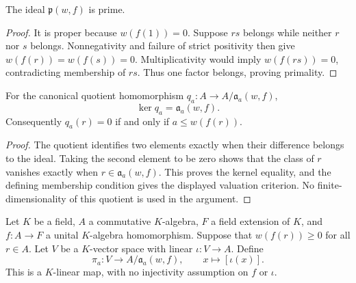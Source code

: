\begin{lemma}
\label{sc0-canonical-port:alg:positive-valuation-ideal-prime}
\leanok
The ideal \(\mathfrak p(w,f)\) is prime.
\end{lemma}
\begin{proof}
It is proper because \(w(f(1))=0\). Suppose \(rs\) belongs
while neither \(r\) nor \(s\) belongs. Nonnegativity and failure
of strict positivity then give \(w(f(r))=w(f(s))=0\).
Multiplicativity would imply \(w(f(rs))=0\), contradicting
membership of \(rs\). Thus one factor belongs, proving primality.
\end{proof}

\begin{lemma}
\label{sc0-canonical-port:alg:valuation-quotient-kernel}
\leanok
For the canonical quotient homomorphism
\(q_a:A\to A/\mathfrak a_a(w,f)\),
\[
 \ker q_a=\mathfrak a_a(w,f).
\]
Consequently \(q_a(r)=0\) if and only if
\(a\leq w(f(r))\).
\end{lemma}
\begin{proof}
The quotient identifies two elements exactly when their difference
belongs to the ideal. Taking the second element to be zero shows
that the class of \(r\) vanishes exactly when
\(r\in\mathfrak a_a(w,f)\). This proves the kernel equality,
and the defining membership condition gives the displayed
valuation criterion. No finite-dimensionality of this quotient is
used in the argument.
\end{proof}

\begin{definition}
\label{sc0-canonical-port:alg:finite-piece-quotient-map}
\leanok
Let \(K\) be a field, \(A\) a commutative \(K\)-algebra,
\(F\) a field extension of \(K\), and \(f:A\to F\) a unital
\(K\)-algebra homomorphism. Suppose that \(w(f(r))\geq0\)
for all \(r\in A\). Let \(V\) be a \(K\)-vector space with
linear \(\iota:V\to A\). Define
\[
 \pi_a:V\longrightarrow A/\mathfrak a_a(w,f),
 \qquad x\longmapsto[\iota(x)].
\]
This is a \(K\)-linear map, with no injectivity assumption on
\(f\) or \(\iota\).
\end{definition}

